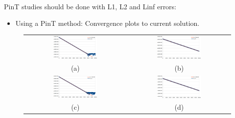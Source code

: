 PinT studies should be done with L1, L2 and Linf errors:
\begin{itemize}
	\item Using a PinT method: Convergence plots to current solution.
\end{itemize}

\begin{figure}[t!]
\begin{tabular}{c c}
\includegraphics[width=0.45\textwidth]{lattice_boltzmann_and_navier_stokes_images/32x32_15x15_taylorgreen_v0.png} & \includegraphics[width=0.45\textwidth]{lattice_boltzmann_and_navier_stokes_images/64x64_31x31_taylorgreen_v0.png}\\
(a) & (b)\\
\includegraphics[width=0.45\textwidth]{lattice_boltzmann_and_navier_stokes_images/32x32_15x15_taylorgreen_v1.png} & \includegraphics[width=0.45\textwidth]{lattice_boltzmann_and_navier_stokes_images/64x64_31x31_taylorgreen_v1.png}\\
(c) & (d)\\

\end{tabular}
\end{figure}
